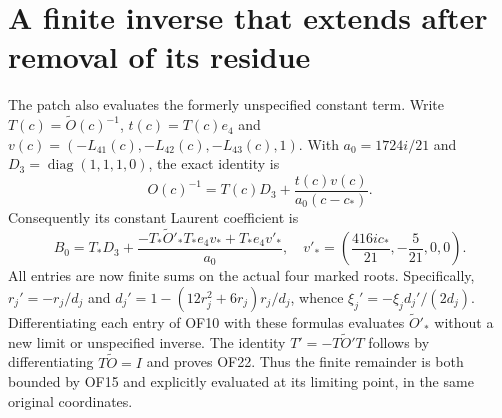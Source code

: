 \documentclass[11pt]{article}
\newcommand{\diag}{\operatorname{diag}}
\begin{document}
\section{A finite inverse that extends after removal of its residue}
The patch also evaluates the formerly unspecified constant term.
Write $T(c)=\widetilde O(c)^{-1}$, $t(c)=T(c)e_4$ and
$v(c)=(-L_{41}(c),-L_{42}(c),-L_{43}(c),1)$.
With $a_0=1724i/21$ and $D_3=\diag(1,1,1,0)$, the exact identity is
\begin{equation}
 O(c)^{-1}=T(c)D_3+\frac{t(c)v(c)}{a_0(c-c_*)}.\tag{OF21}
\end{equation}
Consequently its constant Laurent coefficient is
\begin{equation}
 B_0=T_*D_3+
 \frac{-T_*\widetilde O'_*T_*e_4v_*+T_*e_4v'_*}{a_0},
 \quad
 v'_*=\left(\frac{416ic_*}{21},-\frac5{21},0,0\right).
 \tag{OF22}
\end{equation}
All entries are now finite sums on the actual four marked roots.
Specifically, $r_j'=-r_j/d_j$ and
$d_j'=1-(12r_j^2+6r_j)r_j/d_j$, whence
$\xi_j'=-\xi_jd_j'/(2d_j)$. Differentiating each entry of OF10
with these formulas evaluates $\widetilde O'_*$ without a new
limit or unspecified inverse. The identity $T'=-T\widetilde O'T$
follows by differentiating $T\widetilde O=I$ and proves OF22.
Thus the finite remainder is both bounded by OF15 and explicitly
evaluated at its limiting point, in the same original coordinates.
\end{document}
